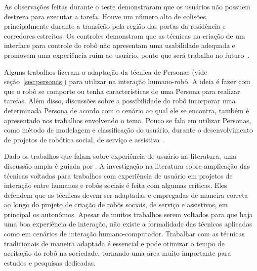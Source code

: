 As observações feitas durante o teste demonstraram que os usuários não possuem destreza para executar a tarefa. Houve um número alto de colisões, principalmente durante a transição pela região das portas da residência e corredores estreitos. Os controles demonstram que as técnicas na criação de um interface para controle do robô não apresentam uma usabilidade adequada e promovem uma experiência ruim ao usuário, ponto que será trabalho no futuro~\cite{mcginn:2017}.

Alguns trabalhos fizeram a adaptação da técnica de Personas (vide seção~\ref{sec:personas}) para utilizar na interação humano-robô. A ideia é fazer com que o robô se comporte ou tenha características de uma Persona para realizar tarefas. Além disso, discussões sobre a possibilidade do robô incorporar uma determinada Persona de acordo com o cenário ao qual ele se encontra, também é apresentado nos trabalhos envolvendo o tema. Pouco se fala em utilizar Personas, como método de modelagem e classificação do usuário, durante o desenvolvimento de projetos de robótica social, de serviço e assistiva~\cite{woods:2005, ljungblad:2006, meerbeek:2009, ruckert:2011, duque:2013, ruckert:2013}.

Dado os trabalhos que falam sobre experiência de usuário na literatura, uma discussão ampla é guiada por . A investigação na literatura sobre amplicação das técnicas voltadas para trabalhos com experiência de usuário em projetos de interação entre humanos e robôs sociais é feita com algumas críticas. Eles defendem que as técnicas devem ser adaptadas e empregadas de maneira correta ao longo do projeto de criação de robôs sociais, de serviço e assistivos, em principal os autonômos. Apesar de muitos trabalhos serem voltados para que haja uma boa experiência de interação, não existe a formalidade das técnicas aplicadas como em cenários de interação humano-computador. Trabalhar com as técnicas tradicionais de maneira adaptada é essencial e pode otimizar o tempo de aceitação do robô na sociedade, tornando uma área muito importante para estudos e pesquisas dedicadas.

